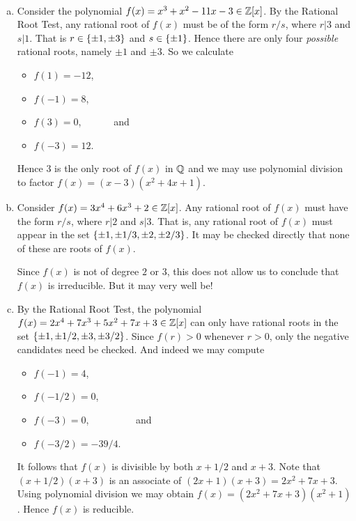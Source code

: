 \documentclass[11pt,fleqn,dvipsnames,usenames]{article}
\newcommand{\p}{\noindent}
\begin{document}
\begin{examples}~
\begin{enumerate}[(a)]
\item Consider the polynomial $f(x) = x^3 + x^2 - 11x - 3\in \mathbb{Z}[x]$.  By the Rational Root Test, any rational root of $f(x)$ must be of the form $r/s$, where $r|3$ and $s|1$.  That is $r\in \left\{\pm1,\pm3\right\}$ and $s\in \left\{\pm1\right\}$.  Hence there are only four \emph{possible} rational roots, namely $\pm1$ and $\pm3$.  So we calculate
\begin{multicols}{4}
\begin{itemize}[\ ]
\item $f(1) = -12$,
\item $f(-1)=8$,
\item $f(3) = 0$, \ \ \ \ \ \ and
\item $f(-3) = 12$.
\end{itemize}
\end{multicols}
Hence $3$ is the only root of $f(x)$ in $\mathbb{Q}$ and we may use polynomial division to factor $f(x) = (x-3)(x^2 + 4x + 1)$.
\item Consider $f(x) = 3x^4 + 6x^3 + 2\in \mathbb{Z}[x]$.   Any rational root of $f(x)$ must have the form $r/s$, where $r|2$ and $s|3$.  That is, any rational root of $f(x)$ must appear in the set $\left\{\pm 1,\pm 1/3,\pm 2,\pm 2/3\right\}$.  It may be checked directly that none of these are roots of $f(x)$.
\vsmsp

\important Since $f(x)$ is not of degree $2$ or $3$, this does not allow us to conclude that $f(x)$ is irreducible.  But it may very well be!

\item By the Rational Root Test, the polynomial $f(x) = 2x^4 + 7x^3 + 5x^2 + 7x + 3\in \mathbb{Z}[x]$ can only have rational roots in the set $\left\{\pm 1, \pm 1/2, \pm 3, \pm 3/2\right\}$.  Since $f(r) > 0$ whenever $r > 0$, only the negative candidates need be checked.  And indeed we may compute
\begin{adjustwidth}{-30pt}{-30pt}
\begin{multicols}{4}
\begin{itemize}[\ ]
\item $f(-1) = 4$,
\item $f(-1/2) = 0$,
\item $f(-3) = 0$, \ \ \ \ \ \ \ \ \ and
\item $f(-3/2) = -39/4$.
\end{itemize}
\end{multicols}
\end{adjustwidth}
\p It follows that $f(x)$ is divisible by both $x + 1/2$ and $x + 3$.  Note that $(x + 1/2)(x + 3)$ is an associate of $(2x + 1)(x + 3) = 2x^2 + 7x + 3$.  Using polynomial division we may obtain $f(x) = (2x^2 + 7x + 3)(x^2 + 1)$.  Hence $f(x)$ is reducible.
\end{enumerate}
\end{examples}
\end{document}
